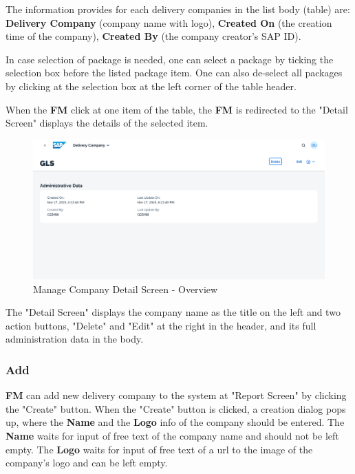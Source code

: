 The information provides for each delivery companies in the list body (table) are: \textbf{Delivery Company} (company name with logo), \textbf{Created On} (the creation time of the company), \textbf{Created By} (the company creator's SAP ID).

In case selection of package is needed, one can select a package by ticking the selection box before the listed package item. One can also de-select all packages by clicking at the selection box at the left corner of the table header.

\bigskip

When the \textbf{FM} click at one item of the table, the \textbf{FM} is redirected to the "Detail Screen" displays the details of the selected item.

\begin{figure}[H]
	\centering
	\includegraphics[width=1\linewidth]{images/user_doc/company/detail/DetailOverview.png}
	\caption{Manage Company Detail Screen - Overview}
	\label{fig:MCdetailOVerview}
\end{figure}

The "Detail Screen" displays the company name as the title on the left and two action buttons, "Delete" and "Edit" at the right in the header, and its full administration data in the body.

\subsubsection{Add}

\textbf{FM} can add new delivery company to the system at "Report Screen" by clicking the "Create" button.
When the "Create" button is clicked, a creation dialog pops up, where the \textbf{Name} and the \textbf{Logo} info of the company should be entered. The \textbf{Name} waits for input of free text of the company name and should not be left empty. The \textbf{Logo} waits for input of free text of a url to the image of the company's logo and can be left empty.

